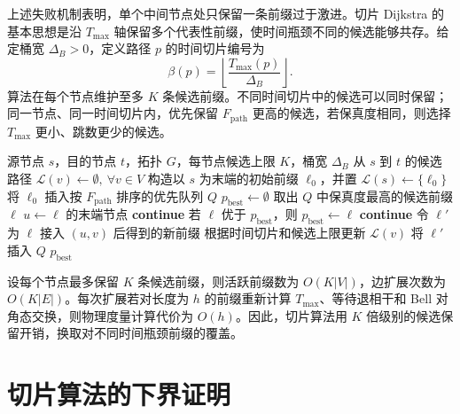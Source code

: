 上述失败机制表明，单个中间节点处只保留一条前缀过于激进。切片 Dijkstra 的基本思想是沿 $T_{\max}$ 轴保留多个代表性前缀，使时间瓶颈不同的候选能够共存。给定桶宽 $\Delta_B>0$，定义路径 $p$ 的时间切片编号为
\begin{equation}
  \beta(p)
  =
  \left\lfloor
    \frac{T_{\max}(p)}{\Delta_B}
  \right\rfloor .
  \label{eq:time-slice-id}
\end{equation}
算法在每个节点维护至多 $K$ 条候选前缀。不同时间切片中的候选可以同时保留；同一节点、同一时间切片内，优先保留 $F_{\mathrm{path}}$ 更高的候选，若保真度相同，则选择 $T_{\max}$ 更小、跳数更少的候选。

\begin{algorithm}[htb]
  \caption{切片 Dijkstra 的多标签搜索流程}
  \label{alg:sliced-dijkstra}
  \begin{algorithmic}[1]
    \REQUIRE 源节点 $s$，目的节点 $t$，拓扑 $G$，每节点候选上限 $K$，桶宽 $\Delta_B$
    \ENSURE 从 $s$ 到 $t$ 的候选路径
    \STATE $\mathcal{L}(v) \gets \emptyset,\ \forall v\in V$
    \STATE 构造以 $s$ 为末端的初始前缀 $\ell_0$，并置 $\mathcal{L}(s)\gets\{\ell_0\}$
    \STATE 将 $\ell_0$ 插入按 $F_{\mathrm{path}}$ 排序的优先队列 $Q$
    \STATE $p_{\mathrm{best}}\gets\emptyset$
      \STATE 取出 $Q$ 中保真度最高的候选前缀 $\ell$
      \STATE $u\gets \ell$ 的末端节点
        \STATE \textbf{continue}
      \ENDIF
        \STATE 若 $\ell$ 优于 $p_{\mathrm{best}}$，则 $p_{\mathrm{best}}\gets \ell$
        \STATE \textbf{continue}
      \ENDIF
        \STATE 令 $\ell'$ 为 $\ell$ 接入 $(u,v)$ 后得到的新前缀
        \STATE 根据时间切片和候选上限更新 $\mathcal{L}(v)$
          \STATE 将 $\ell'$ 插入 $Q$
        \ENDIF
      \ENDFOR
    \ENDWHILE
    \RETURN $p_{\mathrm{best}}$
  \end{algorithmic}
\end{algorithm}

设每个节点最多保留 $K$ 条候选前缀，则活跃前缀数为 $O(K|V|)$，边扩展次数为 $O(K|E|)$。每次扩展若对长度为 $h$ 的前缀重新计算 $T_{\max}$、等待退相干和 Bell 对角态交换，则物理度量计算代价为 $O(h)$。因此，切片算法用 $K$ 倍级别的候选保留开销，换取对不同时间瓶颈前缀的覆盖。

\section{切片算法的下界证明}
\label{sec:sliced-lower-bound}

